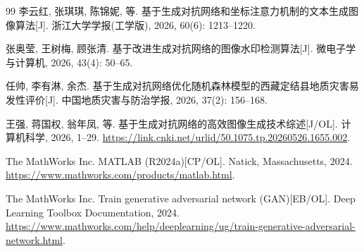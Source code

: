 \documentclass[12pt,a4paper]{ctexart}  %
\begin{document}
\begin{thebibliography}{99}
李云红, 张琪琪, 陈锦妮, 等.
基于生成对抗网络和坐标注意力机制的文本生成图像算法[J].
浙江大学学报(工学版), 2026, 60(6): 1213--1220.

张奥莹, 王树梅, 顾张清.
基于改进生成对抗网络的图像水印检测算法[J].
微电子学与计算机, 2026, 43(4): 50--65.

任帅, 李有淋, 余杰.
基于生成对抗网络优化随机森林模型的西藏定结县地质灾害易发性评价[J].
中国地质灾害与防治学报, 2026, 37(2): 156--168.

王强, 蒋国权, 翁年凤, 等.
基于生成对抗网络的高效图像生成技术综述[J/OL].
计算机科学, 2026, 1--29. \url{https://link.cnki.net/urlid/50.1075.tp.20260526.1655.002}.

The MathWorks Inc.
MATLAB (R2024a)[CP/OL].
Natick, Massachusetts, 2024. \url{https://www.mathworks.com/products/matlab.html}.

The MathWorks Inc.
Train generative adversarial network (GAN)[EB/OL].
Deep Learning Toolbox Documentation, 2024. \url{https://www.mathworks.com/help/deeplearning/ug/train-generative-adversarial-network.html}.

\end{thebibliography}
\end{document}
